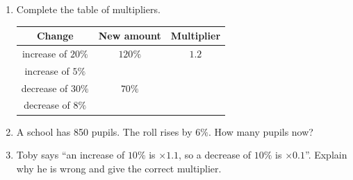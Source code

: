 \documentclass{beamer}
\renewcommand{\arraystretch}{0.92}
\newcommand{\ablank}[1]{%
  \alt<2>{\textcolor{red}{#1}}{\underline{\phantom{#1}}}%
}
\newcommand{\ashow}[1]{\uncover<2->{\textcolor{red}{\small #1}}}
\newcommand{\tightlist}{%
  \setlength{\itemsep}{0pt}\setlength{\parskip}{0pt}\setlength{\topsep}{0pt}%
}
\begin{document}
\begin{frame}
\begin{columns}[T]
\vspace{-1.8em}
\footnotesize
\begin{enumerate}\tightlist
{}
  \item Complete the table of multipliers.
  \vspace{0.3em}
  \begin{center}
  {\renewcommand{\arraystretch}{1.25}\setlength{\tabcolsep}{6pt}
  \begin{tabular}{c|c|c}
    Change & New amount & Multiplier\\ \hline
    increase of $20\%$ & $120\%$ & $1.2$\\
    increase of $5\%$  & \ablank{$105\%$} & \ablank{$1.05$}\\
    decrease of $30\%$ & $70\%$  & \ablank{$0.7$}\\
    decrease of $8\%$  & \ablank{$92\%$} & \ablank{$0.92$}
  \end{tabular}}
  \end{center}
  \vspace{0.4em}
  \item A school has 850 pupils. The roll rises by $6\%$. How many pupils now?
        \ashow{$850\times1.06=901$ pupils}
  \item Toby says ``an increase of $10\%$ is $\times1.1$, so a decrease of $10\%$ is $\times0.1$''.
        Explain why he is wrong and give the correct multiplier.
        \ashow{$\times0.1$ leaves only $10\%$, a decrease of $90\%$. A decrease of $10\%$ leaves $90\%$, so $\times0.9$.}
\end{enumerate}
\end{columns}
\end{frame}
\end{document}
